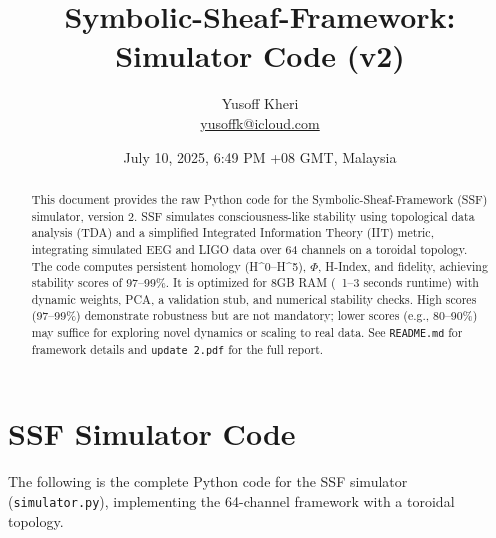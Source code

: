 \documentclass[11pt]{article}
\title{Symbolic-Sheaf-Framework: Simulator Code (v2)}
\author{Yusoff Kheri \\ \href{mailto:yusoffk@icloud.com}{yusoffk@icloud.com}}
\date{July 10, 2025, 6:49 PM +08 GMT, Malaysia}
\begin{document}
\maketitle

\begin{abstract}
This document provides the raw Python code for the Symbolic-Sheaf-Framework (SSF) simulator, version 2. SSF simulates consciousness-like stability using topological data analysis (TDA) and a simplified Integrated Information Theory (IIT) metric, integrating simulated EEG and LIGO data over 64 channels on a toroidal topology. The code computes persistent homology (H^0–H^5), $\Phi$, H-Index, and fidelity, achieving stability scores of 97–99\%. It is optimized for 8GB RAM (~1–3 seconds runtime) with dynamic weights, PCA, a validation stub, and numerical stability checks. High scores (97–99\%) demonstrate robustness but are not mandatory; lower scores (e.g., 80–90\%) may suffice for exploring novel dynamics or scaling to real data. See \texttt{README.md} for framework details and \texttt{update 2.pdf} for the full report.
\end{abstract}

\section{SSF Simulator Code}

The following is the complete Python code for the SSF simulator (\texttt{simulator.py}), implementing the 64-channel framework with a toroidal topology.
\end{document}
